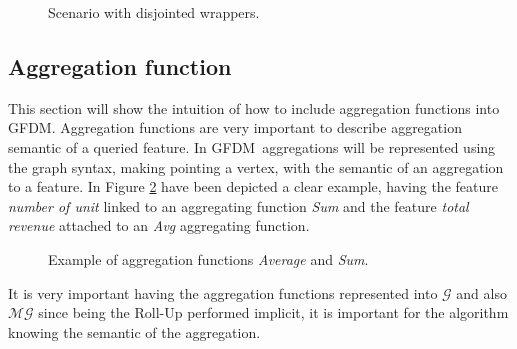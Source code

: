 \documentclass[12pt,a4paper]{report}
\newcommand\systemName{GFDM}
\newcommand\targetGraph{\mathcal{G}}
\newcommand\multidimensionalGraph{\mathcal{MG}}
\begin{document}
\begin{figure} [ht]
    \caption{Scenario with disjointed wrappers.}
    \label{fig:Join_3}
\end{figure}

\subsection{Aggregation function}
This section will show the intuition of how to include aggregation functions into \systemName.
%
Aggregation functions are very important to describe aggregation semantic of a queried feature.
%
In \systemName\, aggregations will be represented using the graph syntax, making pointing a vertex, with the semantic of an aggregation to a feature.
%
In Figure \ref{fig:Aggregations} have been depicted a clear example, having the feature \textit{number of unit} linked to an aggregating function \textit{Sum} and the feature \textit{total revenue} attached to an \textit{Avg} aggregating function.
%
\begin{figure} [ht]
    \caption{Example of aggregation functions \textit{Average} and \textit{Sum}.}
    \label{fig:Aggregations}
\end{figure}
%
It is very important having the aggregation functions represented into $\targetGraph$ and also $\multidimensionalGraph$ since being the Roll-Up performed implicit, it is important for the algorithm knowing the semantic of the aggregation.
\end{document}
